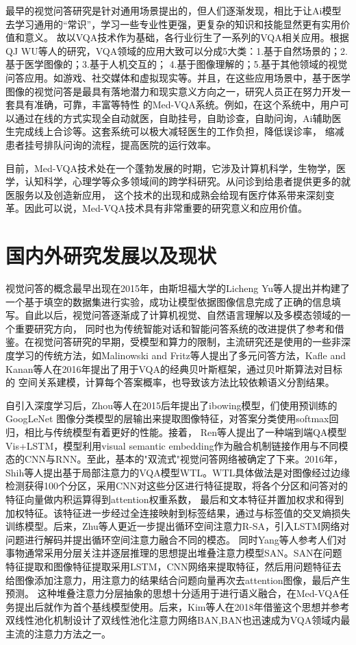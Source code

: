 最早的视觉问答研究是针对通用场景提出的，但人们逐渐发现，相比于让Ai模型去学习通用的“常识”，学习一些专业性更强，更复杂的知识和技能显然更有实用价值和意义。
故以VQA技术作为基础，各行业衍生了一系列的VQA相关应用。根据QJ WU等人\cite{wu2017visual}的研究，VQA领域的应用大致可以分成5大类：1.基于自然场景的；2.基于医学图像的；3.基于人机交互的；
4.基于图像理解的；5.基于其他领域的视觉问答应用。如游戏、社交媒体和虚拟现实等。并且，在这些应用场景中，基于医学图像的视觉问答是最具有落地潜力和现实意义方向之一，研究人员正在努力开发一套具有准确，可靠，丰富等特性
的Med-VQA系统。例如，在这个系统中，用户可以通过在线的方式实现全自动就医，自助挂号，自助诊查，自助问询，Ai辅助医生完成线上合诊等。这套系统可以极大减轻医生的工作负担，降低误诊率，
缩减患者挂号排队问询的流程，提高医院的运行效率。

目前，Med-VQA技术处在一个蓬勃发展的时期，它涉及计算机科学，生物学，医学，认知科学，心理学等众多领域间的跨学科研究。从问诊到给患者提供更多的就医服务以及创造新应用，
这个技术的出现和成熟会给现有医疗体系带来深刻变革。因此可以说，Med-VQA技术具有非常重要的研究意义和应用价值。

%
\section{国内外研究发展以及现状}
视觉问答的概念最早出现在2015年，由斯坦福大学的Licheng Yu等人\cite{yu2015visual}提出并构建了一个基于填空的数据集进行实验，成功让模型依据图像信息完成了正确的信息填写。自此以后，视觉问答逐渐成了计算机视觉、自然语言理解以及多模态领域的一个重要研究方向，
同时也为传统智能对话和智能问答系统的改进提供了参考和借鉴。在视觉问答研究的早期，受模型和算力的限制，主流研究还是使用的一些非深度学习的传统方法，如Malinowski and Fritz等人提出了多元问答方法\cite{malinowski2014multi}，Kafle and Kanan等人\cite{kafle2016answer}在2016年提出了用于VQA的经典贝叶斯框架，通过贝叶斯算法对目标的
空间关系建模，计算每个答案概率，也导致该方法比较依赖语义分割结果。

自引入深度学习后，Zhou等人\cite{zhou2015simple}在2015后年提出了ibowing模型，们使用预训练的 GoogLeNet 图像分类模型的层输出来提取图像特征，对答案分类使用softmax回归，相比与传统模型有着更好的性能。接着，
Ren等人\cite{ren2015exploring}提出了一种端到端QA模型Vis+LSTM，模型利用visual semantic embedding作为融合机制链接作用与不同模态的CNN与RNN。至此，基本的"双流式"视觉问答网络被确定了下来。2016年，Shih等人\cite{shih2016look}提出基于局部注意力的VQA模型WTL。WTL具体做法是对图像经过边缘检测获得100个分区，采用CNN对这些分区进行特征提取，将各个分区和问答对的特征向量做内积运算得到attention权重系数，
最后和文本特征并置加权求和得到加权特征。该特征进一步经过全连接映射到标签结果，通过与标签值的交叉熵损失训练模型。后来，Zhu等人\cite{zhu2016visual7w}更近一步提出循环空间注意力R-SA，引入LSTM网络对问题进行解码并提出循环空间注意力融合不同的模态。
同时Yang等人\cite{yang2016stacked}参考人们对事物通常采用分层关注并逐层推理的思想提出堆叠注意力模型SAN。SAN在问题特征提取和图像特征提取采用LSTM，CNN网络来提取特征，然后用问题特征去给图像添加注意力，用注意力的结果结合问题向量再次去attention图像，最后产生预测。
这种堆叠注意力分层抽象的思想十分适用于进行语义融合，在Med-VQA任务提出后就作为首个基线模型使用\cite{liu2016attention}。后来，Kim等人在2018年借鉴这个思想并参考双线性池化机制设计了双线性池化注意力网络BAN\cite{kim2018bilinear},BAN也迅速成为VQA领域内最主流的注意力方法之一。

